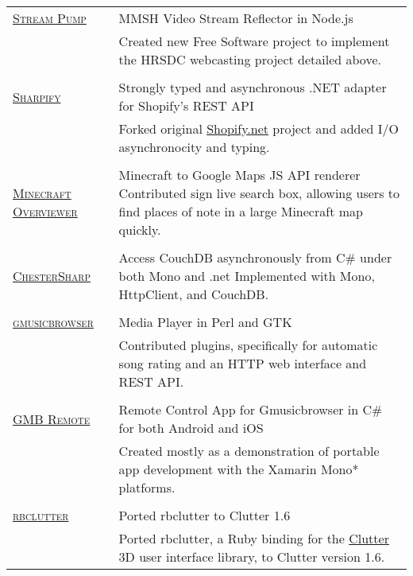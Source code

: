 \documentclass[letterpaper,10pt]{article}
\begin{document}
\begin{longtable}{p{3cm}|p{12cm}}
  \textsc{\href{https://github.com/orospakr/stream-pump}{Stream Pump}} & MMSH Video Stream Reflector in Node.js \\
   & \footnotesize{Created new Free Software project to implement the HRSDC webcasting project detailed above.} \\
  \multicolumn{2}{c}{} \\
  \textsc{\href{https://github.com/orospakr/sharpify}{Sharpify}} & Strongly typed and asynchronous .NET adapter for Shopify's REST API \\
   & \footnotesize{Forked original \href{https://github.com/cmcdonaldca/shopify.net}{Shopify.net} project and added I/O asynchronocity and typing.} \\
  \multicolumn{2}{c}{} \\
  \textsc{\href{https://github.com/brownan/Minecraft-Overviewer}{Minecraft Overviewer}} & Minecraft to Google Maps JS API renderer \newline \footnotesize{Contributed sign live search box, allowing users to find places of note in a large Minecraft map quickly.} \\
  \multicolumn{2}{c}{} \\
  \textsc{\href{https://github.com/orospakr/ChesterSharp}{ChesterSharp}} & Access CouchDB asynchronously from C\# under both Mono and .net \newline \footnotesize{Implemented with Mono, HttpClient, and CouchDB.} \\
  \multicolumn{2}{c}{} \\
  \textsc{\href{http://www.gmusicbrowser.org}{gmusicbrowser}} & Media Player in Perl and GTK \\
   & \footnotesize{Contributed plugins, specifically for automatic song rating and an HTTP web interface and REST API.} \\
  \multicolumn{2}{c}{} \\
  \textsc{\href{https://github.com/orospakr/gmusicbrowser-remote}{GMB Remote}} & Remote Control App for Gmusicbrowser in C\# for both Android and iOS \\
   & \footnotesize{Created mostly as a demonstration of portable app development with the Xamarin Mono* platforms.} \\
  \multicolumn{2}{c}{} \\
  \textsc{\href{https://github.com/orospakr/rbclutter}{rbclutter}} & Ported rbclutter to Clutter 1.6 \\
   & \footnotesize{Ported rbclutter, a Ruby binding for the \href{https://live.gnome.org/Clutter}{Clutter} 3D user interface library, to Clutter version 1.6.} \\

\end{longtable}
\end{document}
